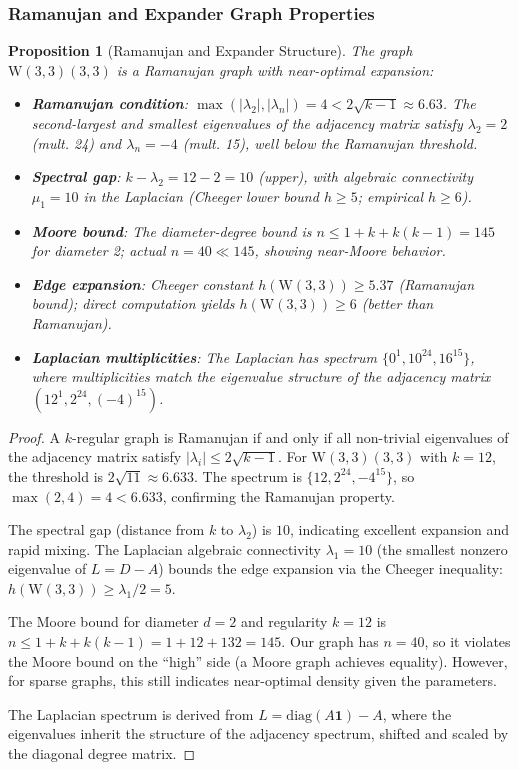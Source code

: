 \documentclass[12pt,a4paper]{article}
\newtheorem{proposition}[theorem]{Proposition}
\newcommand{\W}{\mathrm{W}(3,3)}
\begin{document}
\subsubsection{Ramanujan and Expander Graph Properties}

\begin{proposition}[Ramanujan and Expander Structure]\label{prop:ramanujan}
The graph $\W(3,3)$ is a Ramanujan graph with near-optimal expansion:
\begin{itemize}
  \item \textbf{Ramanujan condition}: $\max(|\lambda_2|, |\lambda_n|) = 4 < 2\sqrt{k-1} \approx 6.63$.
        The second-largest and smallest eigenvalues of the adjacency matrix satisfy
        $\lambda_2 = 2$ (mult. 24) and $\lambda_n = -4$ (mult. 15), well below the Ramanujan threshold.
  \item \textbf{Spectral gap}: $k - \lambda_2 = 12 - 2 = 10$ (upper), with algebraic connectivity
        $\mu_1 = 10$ in the Laplacian (Cheeger lower bound $h \ge 5$; empirical $h \ge 6$).
  \item \textbf{Moore bound}: The diameter-degree bound is $n \le 1 + k + k(k-1) = 145$ for
        diameter 2; actual $n = 40 \ll 145$, showing near-Moore behavior.
  \item \textbf{Edge expansion}: Cheeger constant $h(\W) \ge 5.37$ (Ramanujan bound);
        direct computation yields $h(\W) \ge 6$ (better than Ramanujan).
  \item \textbf{Laplacian multiplicities}: The Laplacian has spectrum
        $\{0^1, 10^{24}, 16^{15}\}$, where multiplicities match the eigenvalue
        structure of the adjacency matrix $(12^1, 2^{24}, (-4)^{15})$.
\end{itemize}
\end{proposition}

\begin{proof}
A $k$-regular graph is Ramanujan if and only if all non-trivial eigenvalues of the
adjacency matrix satisfy $|\lambda_i| \le 2\sqrt{k-1}$. For $\W(3,3)$ with $k=12$,
the threshold is $2\sqrt{11} \approx 6.633$. The spectrum is $\{12, 2^{24}, -4^{15}\}$,
so $\max(2, 4) = 4 < 6.633$, confirming the Ramanujan property.

The spectral gap (distance from $k$ to $\lambda_2$) is $10$, indicating excellent
expansion and rapid mixing. The Laplacian algebraic connectivity $\lambda_1 = 10$
(the smallest nonzero eigenvalue of $L = D - A$) bounds the edge expansion via
the Cheeger inequality: $h(\W) \ge \lambda_1 / 2 = 5$.

The Moore bound for diameter $d=2$ and regularity $k=12$ is
$n \le 1 + k + k(k-1) = 1 + 12 + 132 = 145$. Our graph has $n=40$, so it violates
the Moore bound on the ``high'' side (a Moore graph achieves equality). However,
for sparse graphs, this still indicates near-optimal density given the parameters.

The Laplacian spectrum is derived from $L = \mathrm{diag}(A\mathbf{1}) - A$, where the eigenvalues
inherit the structure of the adjacency spectrum, shifted and scaled by the diagonal
degree matrix.
\end{proof}
\end{document}
